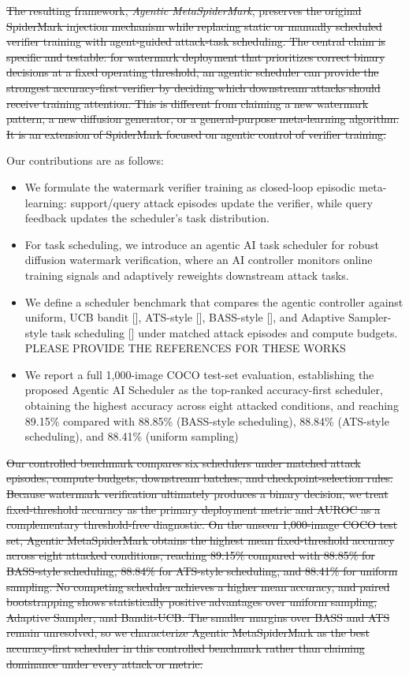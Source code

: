 \sout{
The resulting framework, \emph{Agentic MetaSpiderMark}, preserves the original SpiderMark injection mechanism while replacing static or manually scheduled verifier training with agent-guided attack-task scheduling.
The central claim is specific and testable: for watermark deployment that prioritizes correct binary decisions at a fixed operating threshold, an agentic scheduler can provide the strongest accuracy-first verifier by deciding which downstream attacks should receive training attention.
This is different from claiming a new watermark pattern, a new diffusion generator, or a general-purpose meta-learning algorithm.
It is an extension of SpiderMark focused on agentic control of verifier training.}

{\color{blue}
Our contributions are as follows:
\begin{itemize}
    \item We formulate the  watermark verifier training as closed-loop episodic meta-learning: support/query attack episodes update the verifier, while query feedback updates the scheduler's task distribution.
    
    \item For task scheduling, we introduce an agentic AI task scheduler for robust diffusion watermark verification, where an AI controller monitors online training signals and adaptively reweights downstream attack tasks.
    \item We define a scheduler benchmark that compares the agentic controller against uniform, UCB bandit [], ATS-style [], BASS-style [], and Adaptive Sampler-style task scheduling [] under matched attack episodes and compute budgets. {\color{red} PLEASE PROVIDE THE REFERENCES FOR THESE WORKS}
    \item We report a full 1,000-image COCO test-set evaluation, establishing the proposed Agentic AI Scheduler as the top-ranked accuracy-first scheduler, obtaining the highest accuracy across eight attacked conditions, and reaching 89.15\% compared with 88.85\% (BASS-style scheduling), 88.84\% (ATS-style scheduling), and 88.41\% (uniform sampling)
\end{itemize}
}
\sout{
Our controlled benchmark compares six schedulers under matched attack episodes, compute budgets, downstream batches, and checkpoint-selection rules.
Because watermark verification ultimately produces a binary decision, we treat fixed-threshold accuracy as the primary deployment metric and AUROC as a complementary threshold-free diagnostic.
On the unseen 1,000-image COCO test set, Agentic MetaSpiderMark obtains the highest mean fixed-threshold accuracy across eight attacked conditions, reaching 89.15\% compared with 88.85\% for BASS-style scheduling, 88.84\% for ATS-style scheduling, and 88.41\% for uniform sampling.
No competing scheduler achieves a higher mean accuracy, and paired bootstrapping shows statistically positive advantages over uniform sampling, Adaptive Sampler, and Bandit-UCB.
The smaller margins over BASS and ATS remain unresolved, so we characterize Agentic MetaSpiderMark as the best accuracy-first scheduler in this controlled benchmark rather than claiming dominance under every attack or metric.
}